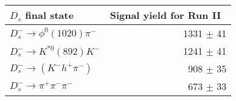  \begin{tabular}{l r }
\hline\hline
$D_s$ final state  & Signal yield for Run II\ \\
\hline
$D_{s}^{-} \to \phi^{0}(1020)\pi^{-}$ & 1331 $\pm$ 41 \\
$D_{s}^{-}\to K^{*0}(892)K^{-}$ & 1241 $\pm$ 41 \\
$D_{s}^{-}\to (K^{-}h^{+}\pi^{-})$ & 908 $\pm$ 35 \\
$D_{s}^{-}\to \pi^{+}\pi^{-}\pi^{-}$ & 673 $\pm$ 33 \\
\hline\hline
\end{tabular}
\label{table:signalYieldsDs_run2}
